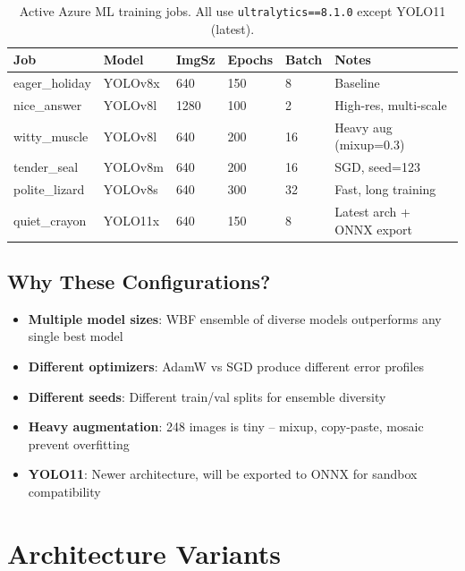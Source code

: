 \documentclass[11pt,a4paper]{article}
\begin{document}
\begin{table}[h]
\centering
\begin{tabular}{@{}llllll@{}}
\toprule
\textbf{Job} & \textbf{Model} & \textbf{ImgSz} & \textbf{Epochs} & \textbf{Batch} & \textbf{Notes} \\
\midrule
\textcolor{running}{eager\_holiday} & YOLOv8x & 640 & 150 & 8 & Baseline \\
\textcolor{running}{nice\_answer} & YOLOv8l & 1280 & 100 & 2 & High-res, multi-scale \\
\textcolor{running}{witty\_muscle} & YOLOv8l & 640 & 200 & 16 & Heavy aug (mixup=0.3) \\
\textcolor{running}{tender\_seal} & YOLOv8m & 640 & 200 & 16 & SGD, seed=123 \\
\textcolor{running}{polite\_lizard} & YOLOv8s & 640 & 300 & 32 & Fast, long training \\
\textcolor{running}{quiet\_crayon} & YOLO11x & 640 & 150 & 8 & Latest arch + ONNX export \\
\bottomrule
\end{tabular}
\caption{Active Azure ML training jobs. All use \texttt{ultralytics==8.1.0} except YOLO11 (latest).}
\end{table}

\subsection{Why These Configurations?}
\begin{itemize}[nosep]
  \item \textbf{Multiple model sizes}: WBF ensemble of diverse models outperforms any single best model
  \item \textbf{Different optimizers}: AdamW vs SGD produce different error profiles
  \item \textbf{Different seeds}: Different train/val splits for ensemble diversity
  \item \textbf{Heavy augmentation}: 248 images is tiny -- mixup, copy-paste, mosaic prevent overfitting
  \item \textbf{YOLO11}: Newer architecture, will be exported to ONNX for sandbox compatibility
\end{itemize}

\section{Architecture Variants}
\end{document}
